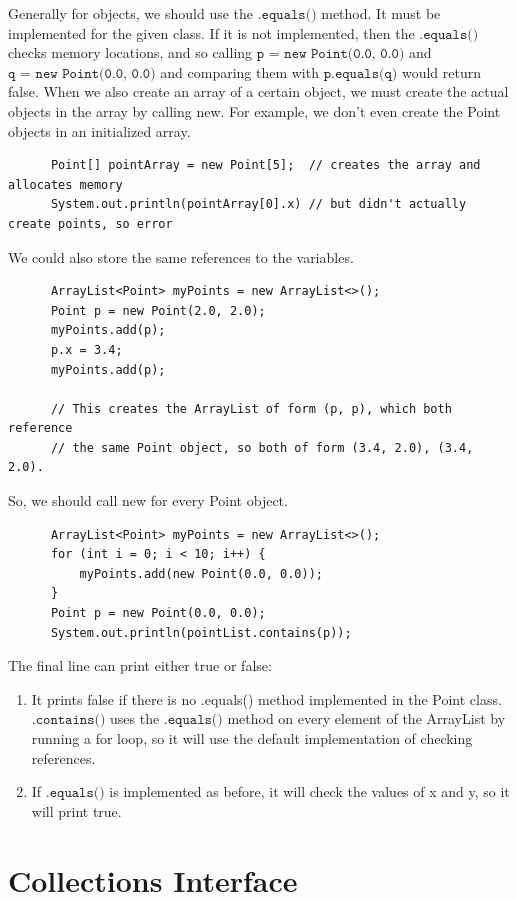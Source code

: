 \documentclass{article}
\begin{document}
      Generally for objects, we should use the $\texttt{.equals()}$ method. It must be implemented for the given class. If it is not implemented, then the $\texttt{.equals()}$ checks memory locations, and so calling $\texttt{p = new Point(0.0, 0.0)}$ and $\texttt{q = new Point(0.0, 0.0)}$ and comparing them with $\texttt{p.equals(q)}$ would return false. When we also create an array of a certain object, we must create the actual objects in the array by calling new. For example, we don't even create the Point objects in an initialized array. 
      \begin{lstlisting}
      Point[] pointArray = new Point[5];  // creates the array and allocates memory 
      System.out.println(pointArray[0].x) // but didn't actually create points, so error
      \end{lstlisting}
      We could also store the same references to the variables. 
      \begin{lstlisting}
      ArrayList<Point> myPoints = new ArrayList<>(); 
      Point p = new Point(2.0, 2.0); 
      myPoints.add(p); 
      p.x = 3.4; 
      myPoints.add(p); 

      // This creates the ArrayList of form (p, p), which both reference 
      // the same Point object, so both of form (3.4, 2.0), (3.4, 2.0). 
      \end{lstlisting}
      So, we should call new for every Point object. 
      \begin{lstlisting}
      ArrayList<Point> myPoints = new ArrayList<>(); 
      for (int i = 0; i < 10; i++) {
          myPoints.add(new Point(0.0, 0.0)); 
      }
      Point p = new Point(0.0, 0.0); 
      System.out.println(pointList.contains(p)); 
      \end{lstlisting}
      The final line can print either true or false: 
      \begin{enumerate}
          \item It prints false if there is no .equals() method implemented in the Point class. $\texttt{.contains()}$ uses the $\texttt{.equals()}$ method on every element of the ArrayList by running a for loop, so it will use the default implementation of checking references. 
          \item If $\texttt{.equals()}$ is implemented as before, it will check the values of x and y, so it will print true.
      \end{enumerate}

\section{Collections Interface}
\end{document}
